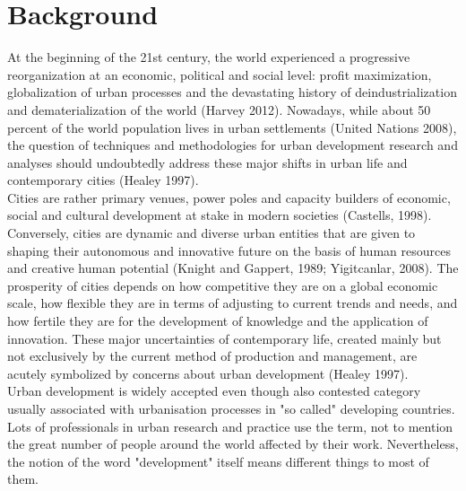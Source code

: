 \documentclass[11pt]{report}
\begin{document}
\section{Background}

At the beginning of the 21st century, the world experienced a progressive reorganization at an economic, political and social level: profit maximization, globalization of urban processes and the devastating history of deindustrialization and dematerialization of the world (Harvey 2012). Nowadays, while about 50 percent of the world population lives in urban settlements (United Nations 2008), the question of techniques and methodologies for urban development research and analyses should undoubtedly address these major shifts in urban life and contemporary cities (Healey 1997).
\\
Cities are rather primary venues, power poles and capacity builders of economic, social and cultural development at stake in modern societies (Castells, 1998). Conversely, cities are dynamic and diverse urban entities that are given to shaping their autonomous and innovative future on the basis of human resources and creative human potential (Knight and Gappert, 1989; Yigitcanlar, 2008). The prosperity of cities depends on how competitive they are on a global economic scale, how flexible they are in terms of adjusting to current trends and needs, and how fertile they are for the development of knowledge and the application of innovation. These major uncertainties of contemporary life, created mainly but not exclusively by the current method of production and management, are acutely symbolized by concerns about urban development (Healey 1997).
\\
Urban development is widely accepted even though also contested category usually associated with urbanisation processes in "so called" developing countries. Lots of professionals in urban research and practice use the term, not to mention the great number of people around the world affected by their work. Nevertheless, the notion of the word "development" itself means different things to most of them.
\end{document}
